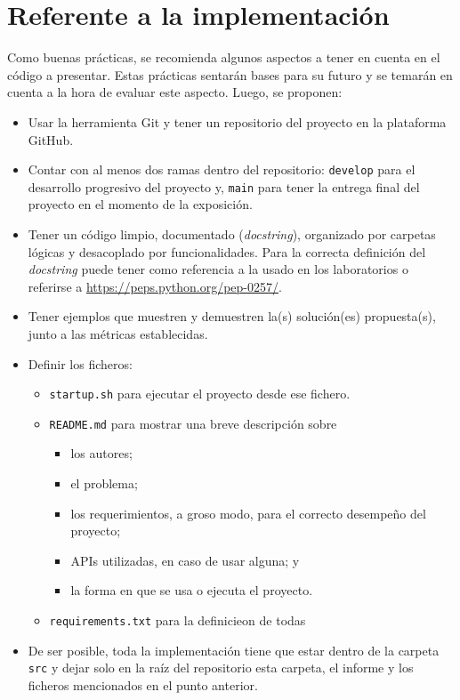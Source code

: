 \documentclass[10pt]{article}
\begin{document}
	
	\section*{Referente a la implementación}
	
		Como buenas prácticas, se recomienda algunos aspectos a tener en cuenta en el código a presentar. Estas prácticas sentarán bases para su futuro y se temarán en cuenta a la hora de evaluar este aspecto. Luego, se proponen:
	
		\begin{itemize}
		
		\item Usar la herramienta Git y tener un repositorio del proyecto en la plataforma GitHub.
		
		\item Contar con al menos dos ramas dentro del repositorio: \texttt{develop} para el desarrollo progresivo del proyecto y, \texttt{main} para tener la entrega final del proyecto en el momento de la exposición.
		
		\item Tener un código limpio, documentado (\emph{docstring}), organizado por carpetas lógicas y desacoplado por funcionalidades. Para la correcta definición del \emph{docstring} puede tener como referencia a la usado en los laboratorios o referirse a \url{https://peps.python.org/pep-0257/}.
		
		\item Tener ejemplos que muestren y demuestren la(s) solución(es) propuesta(s), junto a las métricas establecidas.
		
		\item Definir los ficheros: 
		\begin{itemize}
			\item \texttt{startup.sh} para ejecutar el proyecto desde ese fichero.
			\item \texttt{README.md} para mostrar una breve descripción sobre
				\begin{itemize}
					\item los autores; 
					\item el problema; 
					\item los requerimientos, a groso modo, para el correcto desempeño del proyecto; 
					\item APIs utilizadas, en caso de usar alguna; y 
					\item la forma en que se usa o ejecuta el proyecto.
				\end{itemize}
			\item \texttt{requirements.txt} para la definicieon de todas
		\end{itemize}
		
		\item De ser posible, toda la implementación tiene que estar dentro de la carpeta \texttt{src} y dejar solo en la raíz del repositorio esta carpeta, el informe y los ficheros mencionados en el punto anterior.
		
	\end{itemize}
	
\end{document}
